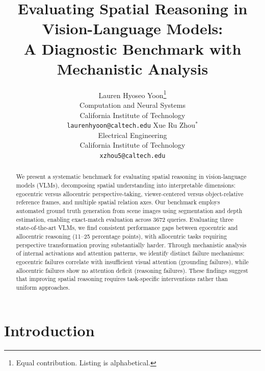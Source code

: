 \documentclass{article}
\title{Evaluating Spatial Reasoning in Vision-Language Models: \\
A Diagnostic Benchmark with Mechanistic Analysis}
\author{%
  Lauren Hyoseo Yoon\thanks{Equal contribution. Listing is alphabetical.} \\
  Computation and Neural Systems \\
  California Institute of Technology \\
  \texttt{laurenhyoon@caltech.edu}
  \And
  Xue Ru Zhou$^*$ \\
  Electrical Engineering \\
  California Institute of Technology \\
  \texttt{xzhou5@caltech.edu}
}
\begin{document}
\maketitle

\begin{abstract}
We present a systematic benchmark for evaluating spatial reasoning in vision-language models (VLMs), decomposing spatial understanding into interpretable dimensions: egocentric versus allocentric perspective-taking, viewer-centered versus object-relative reference frames, and multiple spatial relation axes. Our benchmark employs automated ground truth generation from scene images using segmentation and depth estimation, enabling exact-match evaluation across \num{3672} queries. Evaluating three state-of-the-art VLMs, we find consistent performance gaps between egocentric and allocentric reasoning (11--25 percentage points), with allocentric tasks requiring perspective transformation proving substantially harder. Through mechanistic analysis of internal activations and attention patterns, we identify distinct failure mechanisms: egocentric failures correlate with insufficient visual attention (grounding failures), while allocentric failures show no attention deficit (reasoning failures). These findings suggest that improving spatial reasoning requires task-specific interventions rather than uniform approaches.
\end{abstract}

\section{Introduction}
\label{sec:intro}


\end{document}
